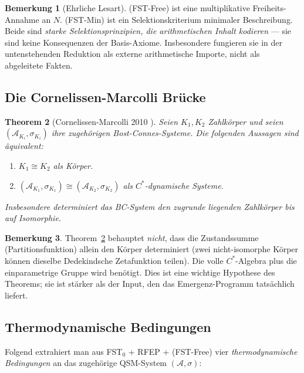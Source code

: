 \documentclass[11pt,a4paper]{article}
\theoremstyle{plain}
\newtheorem{theorem}{Theorem}[section]
\theoremstyle{definition}
\newtheorem{remark}[theorem]{Bemerkung}
\begin{document}
\begin{remark}[Ehrliche Lesart]
\label{rem:fst-free-min-imports}
(FST-Free) ist eine multiplikative Freiheits-Annahme an $N$. (FST-Min)
ist ein Selektionskriterium minimaler Beschreibung. Beide sind \emph{starke
Selektionsprinzipien, die arithmetischen Inhalt kodieren} --- sie sind
keine Konsequenzen der Basis-Axiome. Insbesondere fungieren sie in der
untenstehenden Reduktion als externe arithmetische Importe, nicht
als abgeleitete Fakten.
\end{remark}

\subsection{Die Cornelissen-Marcolli Brücke}
\label{sec:cm-bridge}

\begin{theorem}[Cornelissen-Marcolli
2010 \cite{CornelissenMarcolli2010}]\label{thm:cm-rigidity}
Seien $K_1, K_2$ Zahlkörper und seien $(\mathcal A_{K_i},
\sigma_{K_i})$ ihre zugehörigen Bost-Connes-Systeme. Die folgenden Aussagen
sind äquivalent:
\begin{enumerate}[label=(\roman*)]
\item $K_1 \cong K_2$ als Körper.
\item $(\mathcal A_{K_1}, \sigma_{K_1}) \cong (\mathcal A_{K_2},
  \sigma_{K_2})$ als $C^\ast$-dynamische Systeme.
\end{enumerate}
Insbesondere determiniert das BC-System den zugrunde liegenden Zahlkörper
bis auf Isomorphie.
\end{theorem}

\begin{remark}
Theorem~\ref{thm:cm-rigidity} behauptet \emph{nicht}, dass die
Zustandssumme (Partitionsfunktion) allein den Körper determiniert (zwei
nicht-isomorphe Körper können dieselbe Dedekindsche Zetafunktion teilen).
Die volle $C^\ast$-Algebra plus die einparametrige Gruppe wird benötigt.
Dies ist eine wichtige Hypothese des Theorems; sie ist stärker als der Input, den
das Emergenz-Programm tatsächlich liefert.
\end{remark}

\subsection{Thermodynamische Bedingungen}
\label{sec:thermo-B}

Folgend \cite{LemmaThreeTwo,ThermoDerivation} extrahiert man aus
FST$_0$ + RFEP + (FST-Free) vier \emph{thermodynamische Bedingungen} an
das zugehörige QSM-System $(\mathcal A, \sigma)$:
\end{document}
